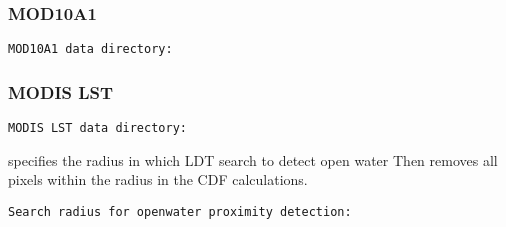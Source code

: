  
 \subsubsection{MOD10A1} 

  

 

 \begin{Verbatim}[frame=single]
MOD10A1 data directory:
 \end{Verbatim}

 
 \subsubsection{MODIS LST} 

  

 

 \begin{Verbatim}[frame=single]
MODIS LST data directory:
 \end{Verbatim}


 
 specifies the radius in which LDT search to detect open water
 Then removes all pixels within the radius in the CDF calculations. 
 
 \begin{Verbatim}[frame=single]
Search radius for openwater proximity detection: 
 \end{Verbatim}



